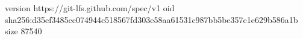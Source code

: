 version https://git-lfs.github.com/spec/v1
oid sha256:d35ef3485cc074944c518567fd303e58aa61531c987bb5be357c1e629b586a1b
size 87540
